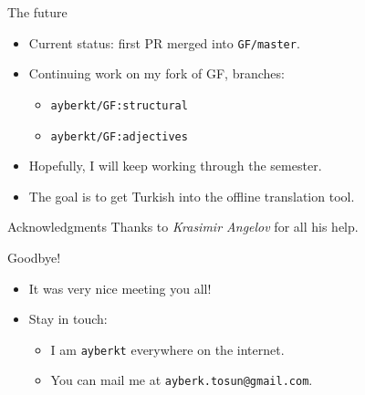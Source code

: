 \documentclass{beamer}
\begin{document}
  \begin{frame}{The future}
    \begin{itemize}
      \item<1-> Current status: first PR merged into \texttt{GF/master}.
      \item<2-> Continuing work on my fork of GF, branches:
        \begin{itemize}
          \item<2-> \texttt{ayberkt/GF:structural}
          \item<2-> \texttt{ayberkt/GF:adjectives}
        \end{itemize}
      \item<3-> Hopefully, I will keep working through the semester.
      \item<4-> The goal is to get Turkish into the offline translation tool.
    \end{itemize}
  \end{frame}

  \begin{frame}{Acknowledgments}
    \Large
      Thanks to \emph{Krasimir Angelov} for all his help.
  \end{frame}

  \begin{frame}{Goodbye!}
    \begin{itemize}
    \item<1-> \alert{It was very nice meeting you all!}
    \item<2-> Stay in touch:
      \begin{itemize}
        \item<3-> I am \alert{\texttt{ayberkt}} everywhere on the internet.
        \item<4-> You can mail me at \texttt{ayberk.tosun@gmail.com}.
      \end{itemize}
    \end{itemize}
  \end{frame}

  
  
\end{document}
